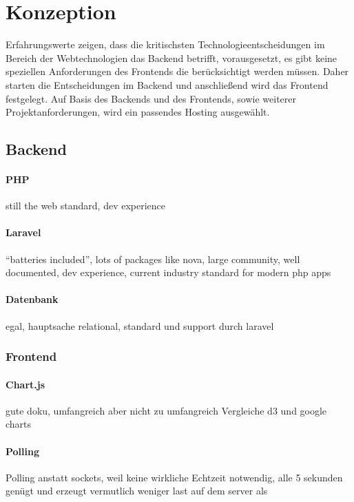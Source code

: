 \section{Konzeption}
Erfahrungswerte zeigen, dass die kritischsten Technologieentscheidungen im Bereich der Webtechnologien das Backend betrifft, vorausgesetzt, es gibt keine speziellen Anforderungen des Frontends die berücksichtigt werden müssen.
Daher starten die Entscheidungen im Backend und anschließend wird das Frontend festgelegt.
Auf Basis des Backends und des Frontends, sowie weiterer Projektanforderungen, wird ein passendes Hosting ausgewählt.

\subsection{Backend}

\paragraph{PHP}
still the web standard, dev experience

\paragraph{Laravel}
\enquote{batteries included}, lots of packages like nova, large community, well documented, dev experience, current industry standard for modern php apps\cite{laravel-nova-docs}

\paragraph{Datenbank}
egal, hauptsache relational, standard und support durch laravel

\subsubsection{Frontend}

\paragraph{Chart.js}
gute doku, umfangreich aber nicht zu umfangreich
Vergleiche d3 und google charts

\paragraph{Polling}
Polling anstatt sockets, weil keine wirkliche Echtzeit notwendig, alle 5 sekunden genügt und erzeugt vermutlich weniger last auf dem server als

